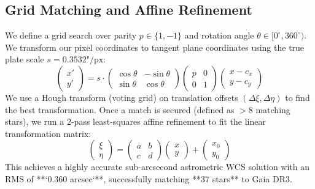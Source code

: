 \documentclass[11pt,a4paper]{article}
\begin{document}
\subsection{Grid Matching and Affine Refinement}
We define a grid search over parity $p \in \{1, -1\}$ and rotation angle $\theta \in [0^\circ, 360^\circ)$. We transform our pixel coordinates to tangent plane coordinates using the true plate scale $s = 0.3532\text{"/px}$:
\begin{equation}
\begin{pmatrix} x' \\ y' \end{pmatrix} = s \cdot \begin{pmatrix} \cos\theta & -\sin\theta \\ \sin\theta & \cos\theta \end{pmatrix} \begin{pmatrix} p & 0 \\ 0 & 1 \end{pmatrix} \begin{pmatrix} x - c_x \\ y - c_y \end{pmatrix}
\end{equation}
We use a Hough transform (voting grid) on translation offsets $(\Delta \xi, \Delta \eta)$ to find the best transformation. Once a match is secured (defined as $>8$ matching stars), we run a 2-pass least-squares affine refinement to fit the linear transformation matrix:
\begin{equation}
\begin{pmatrix} \xi \\ \eta \end{pmatrix} = \begin{pmatrix} a & b \\ c & d \end{pmatrix} \begin{pmatrix} x \\ y \end{pmatrix} + \begin{pmatrix} x_0 \\ y_0 \end{pmatrix}
\end{equation}
This achieves a highly accurate sub-arcsecond astrometric WCS solution with an RMS of **`0.360 arcsec`**, successfully matching **37 stars** to Gaia DR3.
\end{document}
